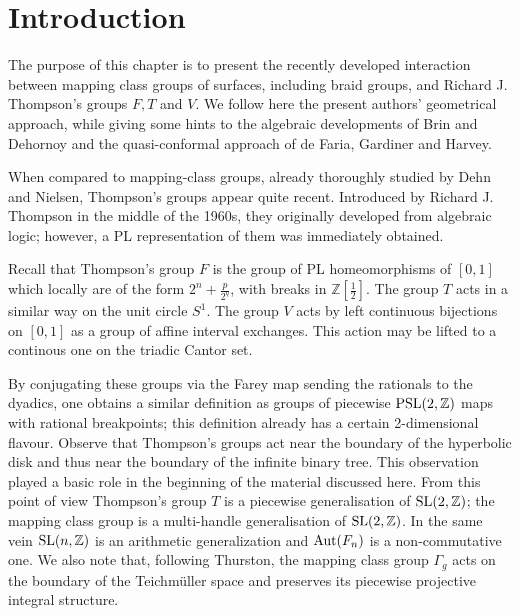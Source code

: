 \documentclass[twoside]{irmaems}
\theoremstyle{plain}
\theoremstyle{definition}
\theoremstyle{remark}
\newcommand{\Z}{{\mathbb{Z}}}
\begin{document}
\begin{small}
\tableofcontents
 \end{small}

\section{Introduction}
The purpose of this chapter is to present 
the recently developed interaction between
mapping class groups of surfaces, including braid groups, and
Richard J. Thompson's groups $F,T$ and $V$. 
We follow here the present authors'
geometrical approach, while giving some hints to the algebraic 
developments of Brin
and Dehornoy and the quasi-conformal approach of de Faria, Gardiner and Harvey.

\vspace{0.1cm}\noindent 
When compared to mapping-class groups, already thoroughly studied by Dehn
and Nielsen, Thompson's groups appear quite recent. Introduced by Richard J. 
Thompson in the middle of the 1960s, they originally developed from
algebraic logic; however, a PL representation of them was immediately obtained.

\vspace{0.1cm}\noindent 
Recall that Thompson's group $F$ is the group of PL homeomorphisms of $[0,1]$
which locally are of the form $2^n+\frac{p}{2^q}$, with breaks in 
$\Z\left[\frac{1}{2}\right]$.
The group $T$ acts in a similar way on the unit circle $S^1$. 
The group $V$ acts by left continuous bijections on $[0,1]$ as 
a group of affine interval exchanges. This 
action may be lifted to a continous one on the triadic
Cantor set.


\vspace{0.1cm}\noindent 
By conjugating these groups via the Farey map sending the rationals to the
dyadics, one obtains a similar definition as 
groups of piecewise ${\rm PSL}(2,\Z)$
maps with rational breakpoints; this definition already has a certain
2-dimensional flavour.
Observe that Thompson's groups act near the boundary of the hyperbolic
disk and thus near the boundary of the infinite binary tree. 
This observation played a basic
role in the beginning of the material discussed here.
From this point of view Thompson's group $T$ is a piecewise generalisation of
${\rm SL}(2,\Z)$; the mapping class group is a multi-handle generalisation of
${\rm SL}(2, \Z)$. 
In the same vein ${\rm SL}(n,\Z)$ is an arithmetic generalization 
and ${\rm Aut}(F_n)$ is a non-commutative one.
We also note that, following Thurston, the mapping class group 
$\Gamma_g$ acts on the
boundary of the Teichm\"uller space and preserves its 
piecewise projective integral structure.
  
\end{document}
